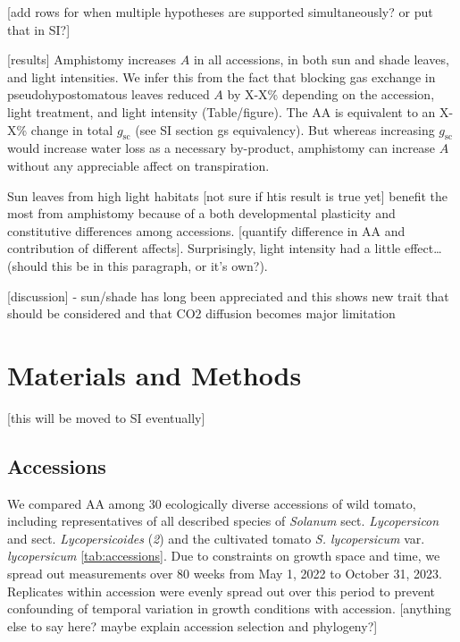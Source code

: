 \documentclass[
  letterpaper,
  DIV=11,
  numbers=noendperiod]{scrartcl}
\begin{document}
{[}add rows for when multiple hypotheses are supported simultaneously?
or put that in SI?{]}

{[}results{]} Amphistomy increases \(A\) in all accessions, in both sun
and shade leaves, and light intensities. We infer this from the fact
that blocking gas exchange in pseudohypostomatous leaves reduced \(A\)
by X-X\% depending on the accession, light treatment, and light
intensity (Table/figure). The AA is equivalent to an X-X\% change in
total \(g_\text{sc}\) (see SI section gs equivalency). But whereas
increasing \(g_\text{sc}\) would increase water loss as a necessary
by-product, amphistomy can increase \(A\) without any appreciable affect
on transpiration.

Sun leaves from high light habitats {[}not sure if htis result is true
yet{]} benefit the most from amphistomy because of a both developmental
plasticity and constitutive differences among accessions. {[}quantify
difference in AA and contribution of different affects{]}. Surprisingly,
light intensity had a little effect\ldots{} (should this be in this
paragraph, or it's own?).

{[}discussion{]} - sun/shade has long been appreciated and this shows
new trait that should be considered and that CO2 diffusion becomes major
limitation

\section{Materials and Methods}\label{materials-and-methods}

{[}this will be moved to SI eventually{]}

\subsection{Accessions}\label{accessions}

We compared AA among 30 ecologically diverse accessions of wild tomato,
including representatives of all described species of \emph{Solanum}
sect. \emph{Lycopersicon} and sect. \emph{Lycopersicoides} (\emph{2})
and the cultivated tomato \emph{S. lycopersicum} var.
\emph{lycopersicum} \autoref{tab:accessions}. Due to constraints on
growth space and time, we spread out measurements over 80 weeks from May
1, 2022 to October 31, 2023. Replicates within accession were evenly
spread out over this period to prevent confounding of temporal variation
in growth conditions with accession. {[}anything else to say here? maybe
explain accession selection and phylogeny?{]}
\end{document}
